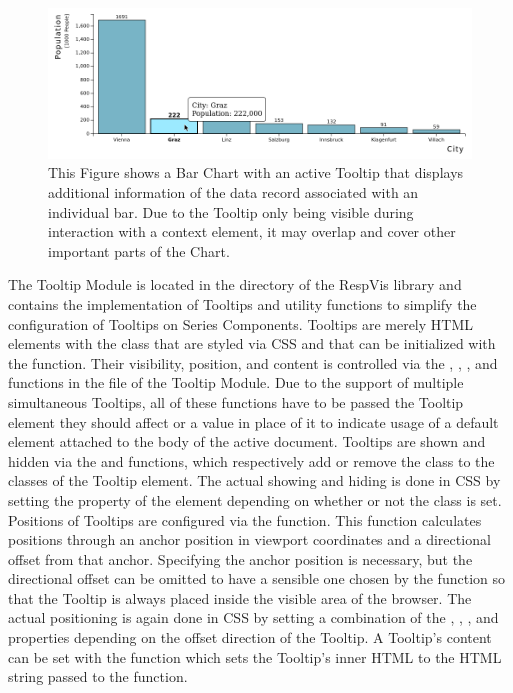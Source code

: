 \begin{figure}[tp]
\centering
\includegraphics[keepaspectratio,width=\linewidth,height=\fullh]
{images/tooltip.png}
\caption[Tooltip Example]{%
This Figure shows a Bar Chart with an active Tooltip that displays
additional information of the data record associated with an
individual bar.  Due to the Tooltip only being visible during
interaction with a context element, it may overlap and cover other
important parts of the Chart. 
}
\label{fig:Tooltip}
\end{figure}


The Tooltip Module is located in the  directory
of the RespVis library and contains the implementation of Tooltips and
utility functions to simplify the configuration of Tooltips on Series
Components.  Tooltips are merely HTML  elements with the
 class that are styled via CSS and that can be
initialized with the  function.  Their visibility,
position, and content is controlled via the ,
, , and 
functions in the  file of the Tooltip Module.  Due to
the support of multiple simultaneous Tooltips, all of these functions
have to be passed the Tooltip element they should affect or a
 value in place of it to indicate usage of a default
element attached to the body of the active document.  Tooltips are
shown and hidden via the  and 
functions, which respectively add or remove the  class to
the classes of the Tooltip element.  The actual showing and hiding is
done in CSS by setting the  property of the element
depending on whether or not the  class is set.  Positions
of Tooltips are configured via the  function.
This function calculates positions through an anchor position in
viewport coordinates and a directional offset from that anchor.
Specifying the anchor position is necessary, but the directional
offset can be omitted to have a sensible one chosen by the
 function so that the Tooltip is always placed
inside the visible area of the browser.  The actual positioning is
again done in CSS by setting a combination of the ,
, , and  properties depending on
the offset direction of the Tooltip.  A Tooltip's content can be set
with the  function which sets the Tooltip's inner
HTML to the HTML string passed to the function.

